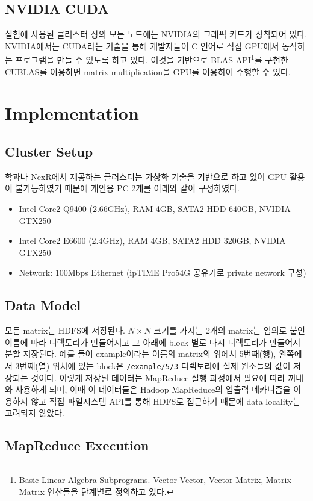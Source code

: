 \documentclass[a4paper]{article}
\begin{document}
\begin{multicols}{2}
\subsection{NVIDIA CUDA}
실험에 사용된 클러스터 상의 모든 노드에는 NVIDIA의 그래픽 카드가 장착되어 있다.
NVIDIA에서는 CUDA라는 기술을 통해 개발자들이 C 언어로 직접 GPU에서 동작하는 프로그램을 만들 수 있도록 하고 있다.
이것을 기반으로 BLAS API\footnote{Basic Linear Algebra Subprograms. Vector-Vector, Vector-Matrix, Matrix-Matrix 연산들을 단계별로 정의하고 있다.}를 구현한 CUBLAS를 이용하면 matrix multiplication을 GPU를 이용하여 수행할 수 있다.


\section{Implementation}
\subsection{Cluster Setup}
학과나 NexR에서 제공하는 클러스터는 가상화 기술을 기반으로 하고 있어 GPU 활용이 불가능하였기 때문에 개인용 PC 2개를 아래와 같이 구성하였다.
\begin{itemize}
	\item Intel Core2 Q9400 (2.66GHz), RAM 4GB, SATA2 HDD 640GB, NVIDIA GTX250
	\item Intel Core2 E6600 (2.4GHz), RAM 4GB, SATA2 HDD 320GB, NVIDIA GTX250
	\item Network: 100Mbps Ethernet (ipTIME Pro54G 공유기로 private network 구성)
\end{itemize}

\subsection{Data Model}
모든 matrix는 HDFS에 저장된다. $N \times N$ 크기를 가지는 2개의 matrix는 임의로 붙인 이름에 따라 디렉토리가 만들어지고 그 아래에 block 별로 다시 디렉토리가 만들어져 분할 저장된다.
예를 들어 example이라는 이름의 matrix의 위에서 5번째(행), 왼쪽에서 3번째(열) 위치에 있는 block은 \texttt{/example/5/3} 디렉토리에 실제 원소들의 값이 저장되는 것이다.
이렇게 저장된 데이터는 MapReduce 실행 과정에서 필요에 따라 꺼내와 사용하게 되며, 이때 이 데이터들은 Hadoop MapReduce의 입출력 메카니즘을 이용하지 않고 직접 파일시스템 API를 통해 HDFS로 접근하기 때문에 data locality는 고려되지 않았다.

\subsection{MapReduce Execution}

\end{multicols}
\end{document}
